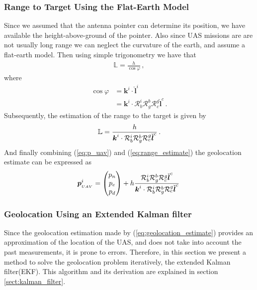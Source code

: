\subsubsection{Range to Target Using the Flat-Earth Model}
Since we assumed that the antenna pointer can determine its position, we have available the height-above-ground of the pointer. Also since UAS missions are are not usually long range we can neglect the curvature of the earth, and assume a flat-earth model. Then using simple trigonometry we have that
\begin{align*}
\mathbb{L}=\frac{h}{\cos\varphi}\,,
\end{align*} 
where
\begin{align*}
\cos\varphi&=\boldsymbol{k}^i\cdot\check{\boldsymbol{l}}^i \\
		   &=\boldsymbol{k}^i\cdot\mathcal{R}_b^i\mathcal{R}_g^b\mathcal{R}_c^g\check{\boldsymbol{l}}^c\,.
\end{align*}
Subsequently, the estimation of the range to the target is given by
\begin{align}{\label{eq:range_estimate}}
\mathbb{L}=\frac{h}{\boldsymbol{k}^i\cdot\mathcal{R}_b^i\mathcal{R}_g^b\mathcal{R}_c^g\check{\boldsymbol{l}}^c}\,.
\end{align}
And finally combining (\ref{eq:p_uav}) and (\ref{eq:range_estimate}) the geolocation estimate can be expressed as
\begin{align}{\label{eq:geolocation_estimate}}
\boldsymbol{p}_{_{UAV}}^i=
\begin{pmatrix}
p_n \\
p_e \\
p_d 
\end{pmatrix}
+ h \frac{\mathcal{R}_b^i\mathcal{R}_g^b\mathcal{R}_c^g\check{\boldsymbol{l}}^c}{\boldsymbol{k}^i\cdot\mathcal{R}_b^i\mathcal{R}_g^b\mathcal{R}_c^g\check{\boldsymbol{l}}^c}\,
\end{align}
\subsubsection{Geolocation Using an Extended Kalman filter}{\label{sub:geolocatoin_with_EKF}}
Since the geolocation estimation made by (\ref{eq:geolocation_estimate}) provides an approximation of the location of the UAS, and does not take into account the past measurements, it is prone to errors. Therefore, in this section we present a method to solve the geolocation problem iteratively, the extended Kalman filter(EKF). This algorithm and its derivation are explained in section \ref{sect:kalman_filter}.


